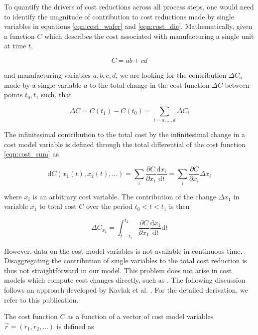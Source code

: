 \documentclass{article}
\begin{document}
To quantify the drivers of cost reductions across all process steps, one would need to identify the magnitude of contribution to cost reductions made by single variables in equations \ref{eqn:cost_wafer} and \ref{eqn:cost_die}. Mathematically, given a function $C$ which describes the cost associated with manufacturing a single unit at time $t$,

\begin{equation}
C=ab+cd
\end{equation}

and manufacturing variables $a,b,c,d$, we are looking for the contribution $\Delta C_{a}$ made by a single variable $a$ to the total change in the cost function $\Delta C$ between points $t_0,t_1$ such, that

\begin{equation}
\Delta C = C(t_1)-C(t_0) = \sum_{i=a, \dots, d} \Delta C_i
\end{equation}

The infinitesimal contribution to the total cost by the infinitesimal change in a cost model variable is defined through the total differential of the cost function \ref{eqn:cost_sum} as

\begin{equation}
\text{d}C(x_1 (t), x_2(t), \dots) = \sum_i \frac{\partial C }{\partial x_i}     \frac{\text{d}x_i}{\text{d}t} = \sum_i \frac{\partial C }{\partial x_i}  \Delta x_i
\end{equation}

where $x_i$ is an arbitrary cost variable. The contribution of the change $\Delta x_1$ in variable $x_1$ to total cost $C$ over the period $t_0 < t < t_1 $ is then

\begin{equation}
\Delta C_{x_1} = \int_{t=t_1}^{t_2} \frac{\partial C }{\partial x_1} \frac{\text{d}x_1}{\text{d}t} \text{d}t
\label{eqn:integral_1}
\end{equation}

However, data on the cost model variables is not available in continuous time. Disaggregating the contribution of single variables to the total cost reduction is thus not straightforward in our model. This problem does not arise in cost models which compute cost changes directly, such as \cite{nemet2012solar} \cite{goodrich2013assessing}. The following discussion follows an approach developed by Kavlak et al. \cite{kavlak2018evaluating}. For the detailed derivation, we refer to this publication.

The cost function $C$ as a function of a vector of cost model variables $\vec{r}=(r_1,r_2,\dots)$ is defined as
\end{document}
